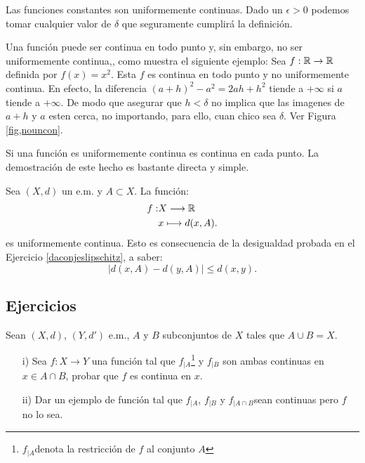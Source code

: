 \begin{ejemplo}{} Las funciones constantes son uniformemente
continuas. Dado un $\epsilon>0$ podemos tomar cualquier valor de
$\delta$ que seguramente cumplirá la definición.
\end{ejemplo}

\begin{ejemplo}{} Una función puede ser continua en todo punto y,
sin embargo, no ser uniformemente continua,, como muestra el
siguiente ejemplo: Sea $f:\mathbb{R}\rightarrow\mathbb{R}$ definida por
$f(x)=x^2$. Esta $f$ es continua en todo punto y no uniformemente
continua. En efecto, la diferencia $(a+h)^2-a^2=2ah+h^2$ tiende a
$+\infty$ si $a$ tiende a $+\infty$. De modo que asegurar que
$h<\delta$ no implica que las imagenes de $a+h$ y $a$ esten cerca,
no importando, para ello, cuan chico sea $\delta$. Ver Figura
\ref{fig,nouncon}.
\end{ejemplo}

Si una función es uniformemente continua es continua en cada
punto. La demostración de este hecho es bastante directa y
simple.

\begin{ejemplo}{} Sea $(X,d)$ un e.m. y $A\subset X$. La función:
\[
    \begin{split}
        f:&X\longrightarrow \mathbb{R}\\
        &x\longmapsto d(x,A).
    \end{split}
\]
es uniformemente continua. Esto es consecuencia de la desigualdad
probada en el Ejercicio \vref{daconjeslipschitz}, a saber:
\[
    |d(x,A)-d(y,A)|\leq d(x,y).
\]
\end{ejemplo}

\subsection{Ejercicios}



\begin{ejercicio}{} Sean $(X,d)$, $(Y,d')$ e.m., $A$ y $B$
subconjuntos de $X$ tales que $A\cup B=X$.
\begin{itemize}
\item[i)] Sea $f:X\rightarrow Y$ una función tal que
$f_{|A}$\footnote{$f_{|A}$denota la restricción de $f$ al
conjunto $A$} y $f_{|B}$ son ambas continuas en $x\in A\cap B$,
probar que $f$ es continua en $x$.
\item[ii)] Dar un ejemplo de función tal que $f_{|A}$, $f_{|B}$ y $f_{|A\cap
B}$sean continuas pero $f$ no lo sea.
\end{itemize}
\end{ejercicio}

